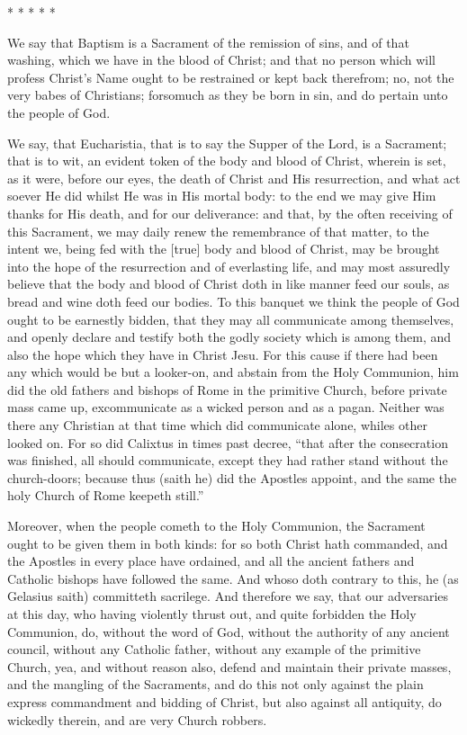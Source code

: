* * * * *

We say that Baptism is a Sacrament of the remission of sins, and
of that washing, which we have in the blood of Christ; and that no person
which will profess Christ’s Name ought to be restrained or kept
back therefrom; no, not the very babes of Christians; forsomuch as they
be born in sin, and do pertain unto the people of God.

We say, that Eucharistia, that is to say the Supper of the Lord,
is a Sacrament; that is to wit, an evident token of the body and blood
of Christ, wherein is set, as it were, before our eyes, the death of
Christ and His resurrection, and what act soever He did whilst He was
in His mortal body: to the end we may give Him thanks for His death,
and for our deliverance: and that, by the often receiving of this Sacrament,
we may daily renew the
remembrance of that matter, to the intent we, being fed with the [true]
body and blood of Christ, may be brought into the hope of the resurrection
and of everlasting life, and may most assuredly believe that the body
and blood of Christ doth in like manner feed our souls, as bread and
wine doth feed our bodies. To this banquet we think the people
of God ought to be earnestly bidden, that they may all communicate among
themselves, and openly declare and testify both the godly society which
is among them, and also the hope which they have in Christ Jesu.
For this cause if there had been any which would be but a looker-on,
and abstain from the Holy Communion, him did the old fathers and bishops
of Rome in the primitive Church, before private mass came up, excommunicate
as a wicked person and as a pagan. Neither was there any Christian
at that time which did communicate alone, whiles other looked on.
For so did Calixtus in times past decree, “that after the consecration
was finished, all should communicate, except they had rather stand without
the church-doors; because thus (saith he) did the Apostles appoint,
and the same the holy Church of Rome keepeth still.”

Moreover, when the people cometh to the Holy Communion, the Sacrament
ought to be given them in
both kinds: for so both Christ hath commanded, and the Apostles in every
place have ordained, and all the ancient fathers and Catholic bishops
have followed the same. And whoso doth contrary to this, he (as
Gelasius saith) committeth sacrilege. And therefore we say, that
our adversaries at this day, who having violently thrust out, and quite
forbidden the Holy Communion, do, without the word of God, without the
authority of any ancient council, without any Catholic father, without
any example of the primitive Church, yea, and without reason also, defend
and maintain their private masses, and the mangling of the Sacraments,
and do this not only against the plain express commandment and bidding
of Christ, but also against all antiquity, do wickedly therein, and
are very Church robbers.

